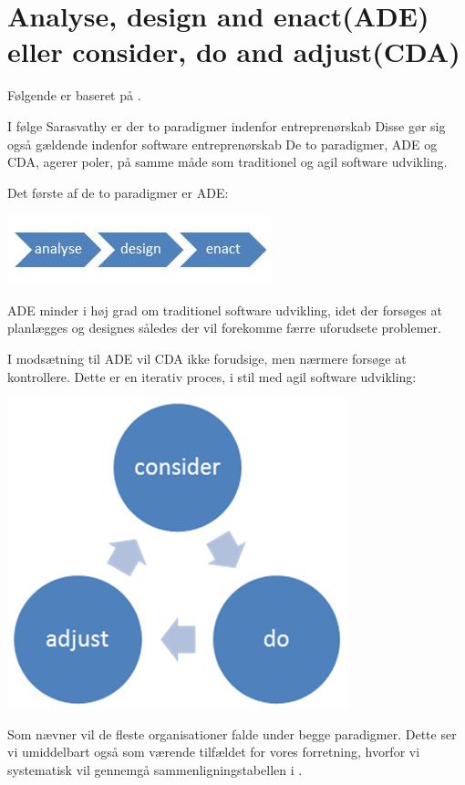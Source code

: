 \section{Analyse, design and enact(ADE) eller consider, do and adjust(CDA)}\label{paradigme}
Følgende er baseret på \cite[pp. 27-38]{rose2012software}.

I følge Sarasvathy er der to paradigmer indenfor entreprenørskab
Disse gør sig også gældende indenfor software entreprenørskab
De to paradigmer, ADE og CDA, agerer poler, på samme måde som traditionel og agil software udvikling.

Det første af de to paradigmer er ADE:\\
\begin{center}
\includegraphics[width=.5\textwidth]{graphics/ade}
\end{center}

ADE minder i høj grad om traditionel software udvikling, idet der forsøges at planlægges og designes således der vil forekomme færre uforudsete problemer.

I modsætning til ADE vil CDA ikke forudsige, men nærmere forsøge at kontrollere.
Dette er en iterativ proces, i stil med agil software udvikling:\\
\begin{center}
\includegraphics[width=.5\textwidth]{graphics/cda}
\end{center}

Som \citet{rose2012software} nævner vil de fleste organisationer falde under begge paradigmer.
Dette ser vi umiddelbart også som værende tilfældet for vores forretning, hvorfor vi systematisk vil gennemgå sammenligningstabellen i \citet[p. 38]{rose2012software}.

